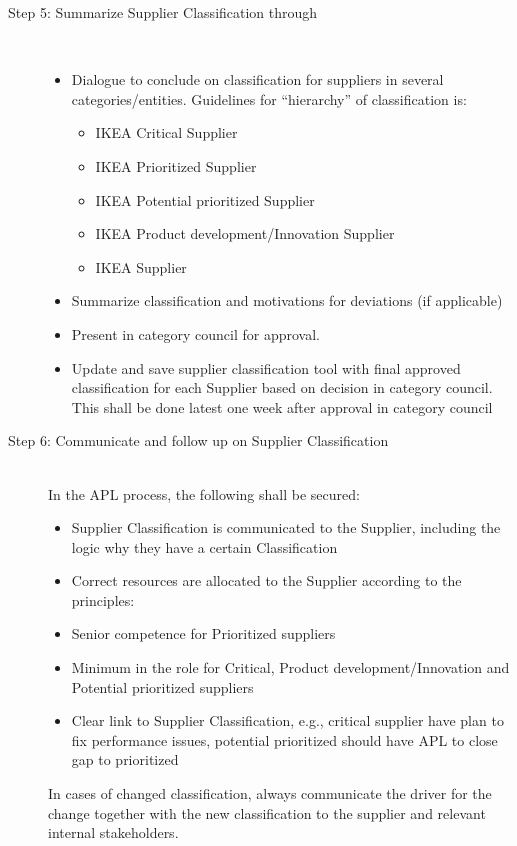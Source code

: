 \documentclass[oneside,12pt]{article}%
\begin{document}
\begin{description}
  \item[Step 5: Summarize Supplier Classification through] \hfill \\
  \begin{itemize}
    \item Dialogue to conclude on classification for suppliers in several categories/entities. Guidelines for “hierarchy” of classification is:
      \begin{itemize}
      \item IKEA Critical Supplier
      \item IKEA Prioritized Supplier
      \item IKEA Potential prioritized Supplier
      \item IKEA Product development/Innovation Supplier
      \item IKEA Supplier
      \end{itemize}
    \item Summarize classification and motivations for deviations (if applicable)
    \item Present in category council for approval.
    \item Update and save supplier classification tool with final approved classification for each Supplier based on decision in category council. This shall be done latest one week after approval in category council

  \end{itemize}
  \item[Step 6: Communicate and follow up on Supplier Classification ] \hfill \\
  In the APL process, the following shall be secured:
  \begin{itemize}
    \item Supplier Classification is communicated to the Supplier, including the logic why they have a certain Classification
    \item Correct resources are allocated to the Supplier according to the principles:
    \item Senior competence for Prioritized suppliers
    \item Minimum in the role for Critical, Product development/Innovation and Potential prioritized suppliers
    \item Clear link to Supplier Classification, e.g., critical supplier have plan to fix performance issues, potential prioritized should have APL to close gap to prioritized
  \end{itemize}
  In cases of changed classification, always communicate the driver for the change together with the new classification to the supplier and relevant internal stakeholders.

\end{description}
\end{document}
